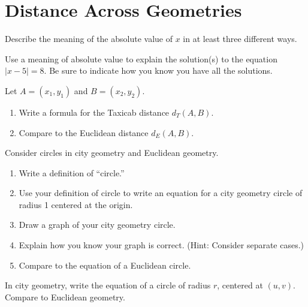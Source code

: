 \newpage

\section{Distance Across Geometries}

\begin{prob}
Describe the meaning of the absolute value of $x$ in at least three different ways.  
\end{prob}


\begin{prob}
Use a meaning of absolute value to explain the solution(s) to the equation $|x - 5| = 8$.  Be sure to indicate how you know you have all the solutions.  
\end{prob}


\begin{prob} 
Let $A = (x_1,y_1)$ and $B = (x_2,y_2)$.  
\begin{enumerate}
\item Write a formula for the Taxicab distance $d_T(A,B)$.
\item Compare to the Euclidean distance $d_E(A,B)$.
\end{enumerate}
\end{prob}

\begin{prob}Consider circles in city geometry and Euclidean geometry.  
\begin{enumerate}
\item Write a definition of ``circle.''
\item Use your definition of circle to write an equation for a city geometry circle of radius 1 centered at the origin. 
\item Draw a graph of your city geometry circle. 
\item Explain how you know your graph is correct.  (Hint:  Consider separate cases.)  
\item Compare to the equation of a Euclidean circle.  
\end{enumerate}
\end{prob}

\begin{prob}
In city geometry, write the equation of a circle of radius $r$, centered at $(u, v)$.  Compare to Euclidean geometry. 
\end{prob}


